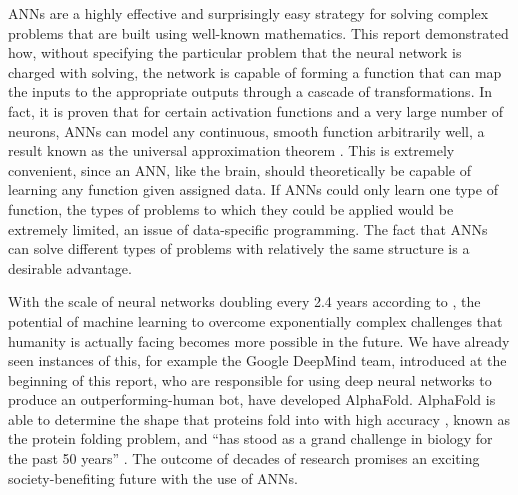 ANNs are a highly effective and surprisingly easy strategy for solving complex problems that are built using well-known mathematics.
This report demonstrated how, without specifying the particular problem that the neural network is charged with solving, the network is capable of forming a function that can map the inputs to the appropriate outputs through a cascade of transformations.
In fact, it is proven that for certain activation functions and a very large number of neurons, ANNs can model any continuous, smooth function arbitrarily well, a result known as the universal approximation theorem \parencite{Goodfellow-et-al-2016}.
This is extremely convenient, since an ANN, like the brain, should theoretically be capable of learning any function given assigned data.
If ANNs could only learn one type of function, the types of problems to which they could be applied would be extremely limited, an issue of data-specific programming. The fact that ANNs can solve different types of problems with relatively the same structure is a desirable advantage.

With the scale of neural networks doubling every 2.4 years according to \textcite{Goodfellow-et-al-2016}, the potential of machine learning to overcome exponentially complex challenges that humanity is actually facing becomes more possible in the future.  We have already seen instances of this, for example the Google DeepMind team, introduced at the beginning of this report, who are responsible for using deep neural networks to produce an outperforming-human bot, have developed AlphaFold. AlphaFold is able to determine the shape that proteins fold into with high accuracy \parencite{dasdas}, known as the protein folding problem, and ``has stood as a grand challenge in biology for the past 50 years'' \parencite{deepmindfold}.
The outcome of decades of research promises an exciting society-benefiting future with the use of ANNs.